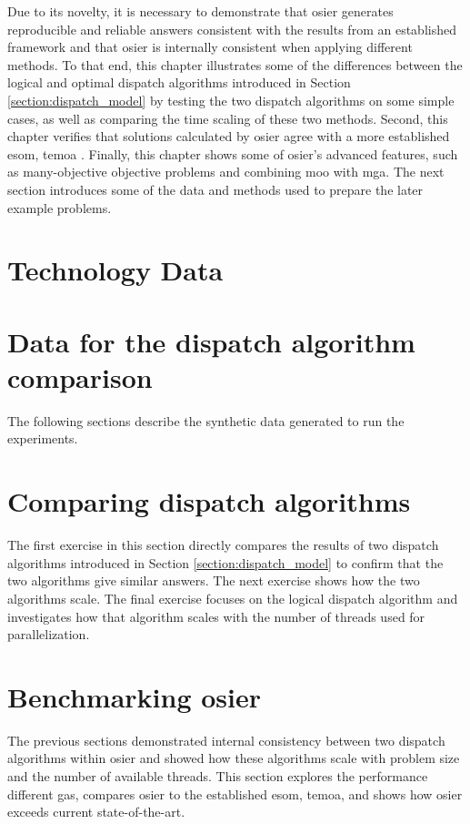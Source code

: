Due to its novelty, it is necessary to demonstrate that \ac{osier} generates
reproducible and reliable answers consistent with the results from an
established framework and that \ac{osier} is internally consistent when applying
different methods. To that end, this chapter illustrates some of the differences
between the logical and optimal dispatch algorithms introduced in Section
\ref{section:dispatch_model} by testing the two dispatch algorithms  
on some simple cases, as well as comparing the time scaling of these two
methods. Second, this chapter verifies that solutions calculated by \ac{osier}
agree with a more established \ac{esom}, \ac{temoa} \cite{hunter_modeling_2013}.
Finally, this chapter shows some of \ac{osier}'s advanced features, such as
many-objective objective problems and combining \ac{moo} with \ac{mga}. The next
section introduces some of the data and methods used to prepare the later
example problems.


\section{Technology Data}

\section{Data for the dispatch algorithm comparison}
The following sections describe the synthetic data generated to run the experiments.


\section{Comparing dispatch algorithms}
The first exercise in this section directly compares the results of two dispatch
algorithms introduced in Section \ref{section:dispatch_model} to confirm that
the two algorithms give similar answers. The next exercise shows how the two
algorithms scale. The final exercise focuses on the logical dispatch algorithm
and investigates how that algorithm scales with the number of threads used for
parallelization.
% 

\section{Benchmarking \ac{osier}}
The previous sections demonstrated internal consistency between two dispatch algorithms
within \ac{osier} and showed how these algorithms scale with problem size and the number
of available threads. This section explores the performance different \acp{ga}, compares 
\ac{osier} to the established \ac{esom}, \ac{temoa}, and shows how \ac{osier} exceeds
current state-of-the-art.




